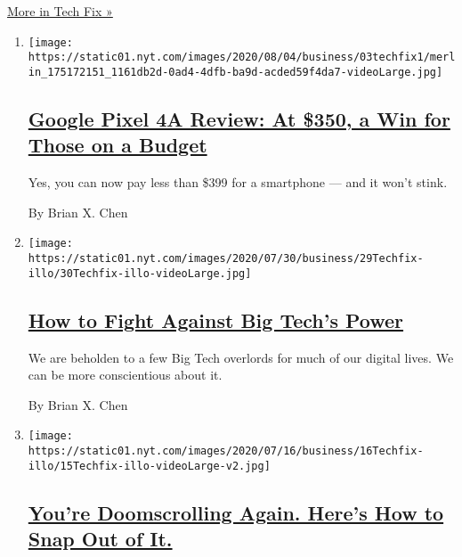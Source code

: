 \href{/column/tech-fix}{More in Tech Fix »}

\begin{enumerate}
\def\labelenumi{\arabic{enumi}.}
\item
  \texttt{[image: https://static01.nyt.com/images/2020/08/04/business/03techfix1/merlin\_175172151\_1161db2d-0ad4-4dfb-ba9d-acded59f4da7-videoLarge.jpg]}

  \hypertarget{google-pixel-4a-review-at-350-a-win-for-those-on-a-budget}{%
  \subsection{\texorpdfstring{\href{/2020/08/03/technology/personaltech/google-pixel-4a-review.html}{Google
  Pixel 4A Review: At \$350, a Win for Those on a
  Budget}}{Google Pixel 4A Review: At \$350, a Win for Those on a Budget}}\label{google-pixel-4a-review-at-350-a-win-for-those-on-a-budget}}

  Yes, you can now pay less than \$399 for a smartphone --- and it won't
  stink.

  By Brian X. Chen
\item
  \texttt{[image: https://static01.nyt.com/images/2020/07/30/business/29Techfix-illo/30Techfix-illo-videoLarge.jpg]}

  \hypertarget{how-to-fight-against-big-techs-power}{%
  \subsection{\texorpdfstring{\href{/2020/07/29/technology/personaltech/big-tech-power-how-to-fight.html}{How
  to Fight Against Big Tech's
  Power}}{How to Fight Against Big Tech's Power}}\label{how-to-fight-against-big-techs-power}}

  We are beholden to a few Big Tech overlords for much of our digital
  lives. We can be more conscientious about it.

  By Brian X. Chen
\item
  \texttt{[image: https://static01.nyt.com/images/2020/07/16/business/16Techfix-illo/15Techfix-illo-videoLarge-v2.jpg]}

  \hypertarget{youre-doomscrolling-again-heres-how-to-snap-out-of-it}{%
  \subsection{\texorpdfstring{\href{/2020/07/15/technology/personaltech/youre-doomscrolling-again-heres-how-to-snap-out-of-it.html}{You're
  Doomscrolling Again. Here's How to Snap Out of
  It.}}{You're Doomscrolling Again. Here's How to Snap Out of It.}}\label{youre-doomscrolling-again-heres-how-to-snap-out-of-it}}


\end{enumerate}
